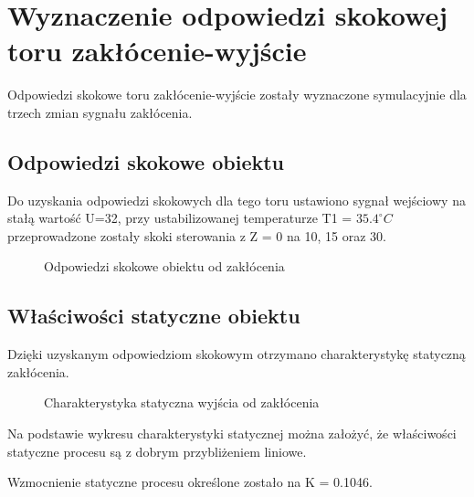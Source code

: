 \section{Wyznaczenie odpowiedzi skokowej toru zakłócenie-wyjście}
\label{lab:zad2}
Odpowiedzi skokowe toru zakłócenie-wyjście zostały wyznaczone symulacyjnie dla trzech
zmian sygnału zakłócenia.
\subsection{Odpowiedzi skokowe obiektu}
\label{lab:zad2:odpSkok}

Do uzyskania odpowiedzi skokowych dla tego toru ustawiono sygnał wejściowy na stałą
wartość U=\num{32}, 
przy ustabilizowanej temperaturze T1 = $\num{35.4}^{\circ} C$ przeprowadzone zostały
skoki sterowania z Z = \num{0} na \num{10}, \num{15} oraz \num{30}.

\begin{figure}[H] 
    \centering
    
    \caption{Odpowiedzi skokowe obiektu od zakłócenia}
    \label{lab:zad2:odpSkok:figure}
\end{figure}

\newpage

\subsection{Właściwości statyczne obiektu}
\label{lab:zad2:charStat}

Dzięki uzyskanym odpowiedziom skokowym otrzymano charakterystykę statyczną
zakłócenia.
\newpage

\begin{figure}[H] 
    \centering
    
    \caption{Charakterystyka statyczna wyjścia od zakłócenia}
    \label{lab:zad2:charStat:figure}
\end{figure}

Na podstawie wykresu charakterystyki statycznej można założyć, 
że właściwości statyczne procesu są z dobrym przybliżeniem liniowe. 

Wzmocnienie statyczne procesu określone zostało na K = \num{0,1046}.

\newpage
